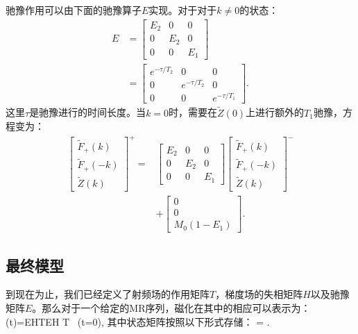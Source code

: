  驰豫作用可以由下面的驰豫算子$E$实现。对于对于$k\neq 0$的状态：
  \begin{align}
 E&=
  \left[
  \begin{matrix}
   {E}_2 & 0 & 0 \\
   0 & {E}_2 & 0 \\
   0 & 0 & {E}_1
   \end{matrix}
   \right] \nonumber\\ &=
   \left[
  \begin{matrix}
   e^{-\tau/T_2} & 0 & 0 \\
   0 & e^{-\tau/T_2} & 0 \\
   0 & 0 & e^{-\tau/T_1}
   \end{matrix}
   \right].
 \end{align}
  这里$\tau$是驰豫进行的时间长度。当$k=0$时，需要在$\tilde{Z}(0)$上进行额外的$T_1$驰豫，方程变为：
 \begin{align}
 \left[
  \begin{matrix}
   \tilde{F}_+(k) \\
   \tilde{F}_+(-k) \\
   \tilde{Z}(k)
   \end{matrix}
   \right]^+
   =&
   \left[
  \begin{matrix}
   {E}_2 & 0 & 0 \\
   0 & {E}_2 & 0 \\
   0 & 0 & {E}_1
   \end{matrix}
   \right] \left[
  \begin{matrix}
   \tilde{F}_+(k) \\
   \tilde{F}_+(-k) \\
   \tilde{Z}(k)
   \end{matrix}
   \right]^- \nonumber\\
   & +
   \left[
  \begin{matrix}
   0 \\
   0 \\
   M_0(1-E_1)
   \end{matrix}
   \right].
 \end{align}
 
 \subsection{最终模型}
 到现在为止，我们已经定义了射频场的作用矩阵$T$，梯度场的失相矩阵$H$以及驰豫矩阵$E$。那么对于一个给定的MR序列，磁化在其中的相应可以表示为：
 \beq \Gamma(t)=\cdots E\cdot H\cdot T\cdot E\cdot H
 \cdot T \cdot \Gamma\ (t=0),\eeq 
 其中状态矩阵按照以下形式存储：
 \beq 
 \Gamma=
 .
 \eeq 

